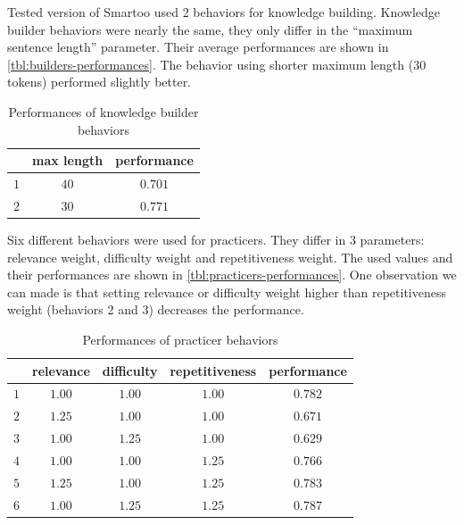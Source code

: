 \documentclass[12pt, twoside]{fithesis2}
\renewcommand{\_}{\leavevmode \kern0.07em\vbox{\hrule width0.4em}}
\begin{document}
Tested version of Smartoo used 2 behaviors for knowledge building.
Knowledge builder behaviors were nearly the same, they only differ in the ``maximum sentence length'' parameter.
Their average performances are shown in \autoref{tbl:builders-performances}.
The behavior using shorter maximum length (30 tokens) performed slightly better.

\begin{table}[h]
\begin{center}
\begin{tabular}{| c | c | c |}
  \hline
      & max length & performance\\
  \hline
  $1$ & $40$ & $0.701$\\
  $2$ & $30$ & $0.771$\\
  \hline
\end{tabular}
\end{center}
\caption{Performances of knowledge builder behaviors}
\label{tbl:builders-performances}
\end{table}

Six different behaviors were used for practicers.
They differ in 3 parameters: relevance weight, difficulty weight and repetitiveness weight.
The used values and their performances are shown in \autoref{tbl:practicers-performances}.
One observation we can made is that setting relevance or difficulty weight higher than repetitiveness weight (behaviors 2 and 3) decreases the performance.

\begin{table}[h]
\begin{center}
\begin{tabular}{| c | c  c  c | c |}
  \hline
      & relevance & difficulty & repetitiveness & performance\\
  \hline
  $1$ & $1.00$ & $1.00$ & $1.00$ & $0.782$\\
  $2$ & $1.25$ & $1.00$ & $1.00$ & $0.671$\\
  $3$ & $1.00$ & $1.25$ & $1.00$ & $0.629$\\
  $4$ & $1.00$ & $1.00$ & $1.25$ & $0.766$\\
  $5$ & $1.25$ & $1.00$ & $1.25$ & $0.783$\\
  $6$ & $1.00$ & $1.25$ & $1.25$ & $0.787$\\
  \hline
\end{tabular}
\end{center}
\caption{Performances of practicer behaviors}
\label{tbl:practicers-performances}
\end{table}
\end{document}
